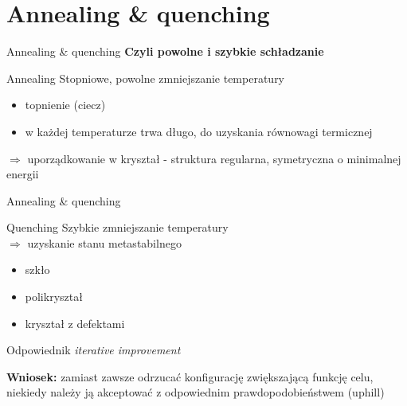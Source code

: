 \section{Annealing \& quenching}


	\begin{frame}{Annealing \& quenching}
		\textbf{Czyli powolne i szybkie schładzanie}
		\begin{block}{Annealing}
			Stopniowe, powolne zmniejszanie temperatury
			\begin{itemize}
				\item topnienie (ciecz)
				\item w każdej temperaturze trwa długo, do uzyskania równowagi termicznej
			\end{itemize}
			$\Rightarrow$ uporządkowanie w kryształ - struktura regularna, symetryczna o minimalnej energii
		\end{block}
	\end{frame}


	\begin{frame}{Annealing \& quenching}
		\begin{block}{Quenching}
			Szybkie zmniejszanie temperatury \\
			$\Rightarrow$ uzyskanie stanu metastabilnego
			\begin{itemize}
				\item szkło
				\item polikryształ
				\item kryształ z defektami
			\end{itemize}
			Odpowiednik \textit{iterative improvement}
		\end{block}
		\textbf{Wniosek:} zamiast zawsze odrzucać konfigurację zwiększającą funkcję celu, niekiedy należy ją akceptować z odpowiednim prawdopodobieństwem (uphill)
	\end{frame}